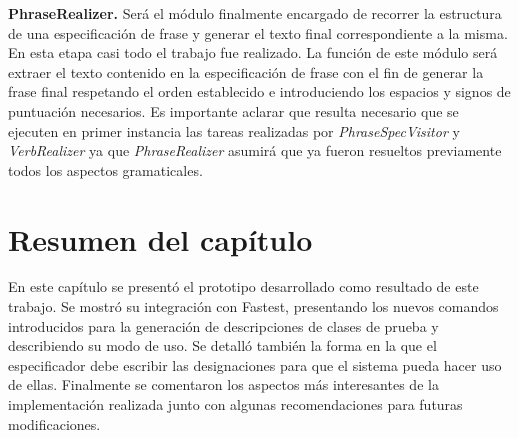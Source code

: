 \bigskip
\noindent
\textbf{PhraseRealizer.} Será el módulo finalmente encargado de recorrer la estructura de una especificación de frase y generar el texto final correspondiente a la misma. En esta etapa casi todo el trabajo fue realizado. La función de este módulo será extraer el texto contenido en la especificación de frase con el fin de generar la frase final respetando el orden establecido e introduciendo los espacios y signos de puntuación necesarios. Es importante aclarar que resulta necesario que se ejecuten en primer instancia las tareas realizadas por \textit{PhraseSpecVisitor} y \textit{VerbRealizer} ya que \textit{PhraseRealizer} asumirá que ya fueron resueltos previamente todos los aspectos gramaticales.

\section{Resumen del capítulo}
En este capítulo se presentó el prototipo desarrollado como resultado de este trabajo. Se mostró su integración con Fastest, presentando los nuevos comandos introducidos para la generación de descripciones de clases de prueba y describiendo su modo de uso. Se detalló también la forma en la que el especificador debe escribir las designaciones para que el sistema pueda hacer uso de ellas. Finalmente se comentaron los aspectos más interesantes de la implementación realizada junto con algunas recomendaciones para futuras modificaciones.